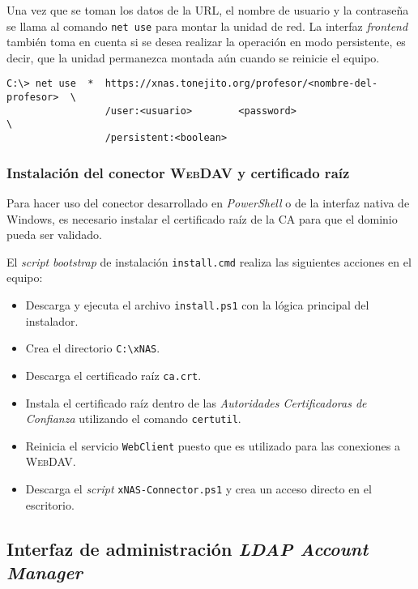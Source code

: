Una vez que se toman los datos de la \textsc{URL}, el nombre de usuario y la contrase\~{n}a se llama al comando \texttt{net use} para montar la unidad de red. La interfaz \textit{frontend} tambi\'{e}n toma en cuenta si se desea realizar la operaci\'{o}n en modo persistente, es decir, que la unidad permanezca montada a\'{u}n cuando se reinicie el equipo.

{
\footnotesize
\linespread{1}
\begin{verbatim}
C:\> net use  *  https://xnas.tonejito.org/profesor/<nombre-del-profesor>  \
                 /user:<usuario>        <password>                         \
                 /persistent:<boolean>
\end{verbatim}
}

\newpage
        \subsubsection {Instalaci\'{o}n del conector \textsc{WebDAV} y certificado ra\'{i}z}

Para hacer uso del conector desarrollado en \textsl{PowerShell} o de la interfaz nativa de Windows, es necesario instalar el certificado ra\'{i}z de la \textsc{CA} para que el dominio pueda ser validado. 

El \textit{script} \textit{bootstrap} de instalaci\'{o}n \texttt{install.cmd} realiza las siguientes acciones en el equipo:

\begin{itemize}
  \item Descarga y ejecuta el archivo \texttt{install.ps1} con la l\'{o}gica principal del instalador.
  \item Crea el directorio \texttt{C:{\textbackslash}xNAS}.
  \item Descarga el certificado ra\'{i}z \texttt{ca.crt}.
  \item Instala el certificado ra\'{i}z dentro de las \emph{Autoridades Certificadoras de Confianza} utilizando el comando \texttt{certutil}.
  \item Reinicia el servicio \texttt{WebClient} puesto que es utilizado para las conexiones a \textsc{WebDAV}.
  \item Descarga el \textit{script} \texttt{xNAS-Connector.ps1} y crea un acceso directo en el escritorio.
\end{itemize}

      \subsection {Interfaz de administraci\'{o}n \textit{LDAP Account Manager}}


